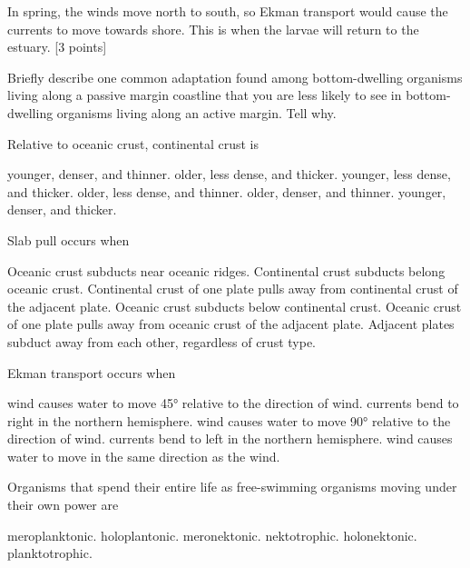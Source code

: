 \documentclass[12pt,addpoints]{exam}
\newenvironment{AnswerPage}[1]
    {\begin{minipage}[t][#1]{0.92\textwidth}%
    \begin{solution}}
    {\end{solution}\end{minipage}
    \vspace{\stretch{1}}}
\begin{document}
\begin{questions}
\begin{AnswerPage}{0.2\textheight}
	In spring, the winds move north to south, so Ekman transport would cause the currents to move towards shore. This is when the larvae will return to the estuary. [3 points]
	
\end{AnswerPage}

\question[5]
Briefly describe one common adaptation found among bottom-dwelling organisms living along a passive margin coastline that you are less likely to see in bottom-dwelling organisms living along an active margin. Tell why.

\begin{AnswerPage}{0.1\textheight}
	
\end{AnswerPage}



\newpage


\question[2]
Relative to oceanic crust, continental crust is
\begin{choices}
\choice younger, denser, and thinner.
\correctchoice older, less dense, and thicker.
\choice younger, less dense, and thicker.
\choice older, less dense, and thinner.
\choice older, denser, and thinner.
\choice younger, denser, and thicker.
\end{choices}

\question[2]
Slab pull occurs when
\begin{choices}
	\choice Oceanic crust subducts near oceanic ridges.
	\choice Continental crust subducts belong oceanic crust.
	\choice Continental crust of one plate pulls away from continental crust of the adjacent plate.
	\correctchoice Oceanic crust subducts below continental crust.
	\choice Oceanic crust of one plate pulls away from oceanic crust of the adjacent plate.
	\choice Adjacent plates subduct away from each other, regardless of crust type.
\end{choices}

\question[2]
Ekman transport occurs when
\begin{choices}
	\choice wind causes water to move 45° relative to the direction of wind.
	\choice currents bend to right in the northern hemisphere.
	\correctchoice wind causes water to move 90° relative to the direction of wind.
	\choice currents bend to left in the northern hemisphere.	
	\choice wind causes water to move in the same direction as the wind.
\end{choices}

\question[2]
Organisms that spend their entire life as free-swimming organisms moving under their own power are
\begin{choices}
	\choice meroplanktonic.
	\choice holoplantonic.
	\choice meronektonic.
	\choice nektotrophic.
	\correctchoice holonektonic.
	\choice planktotrophic.
\end{choices}




\end{questions}
\end{document}
